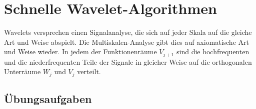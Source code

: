 %
%
%
\chapter{Schnelle Wavelet-Algorithmen
\label{chapter:algo}}
Wavelets versprechen einen Signalanalyse, die sich auf jeder Skala auf
die gleiche Art und Weise abspielt.
Die Multiskalen-Analyse gibt dies auf axiomatische Art und Weise wieder.
In jedem der Funktionenräume $V_{j+1}$ sind die hochfrequenten und die 
niederfrequenten Teile der Signale in gleicher Weise auf die 
orthogonalen Unterräume $W_j$ und $V_j$ verteilt.





\section*{Übungsaufgaben}






